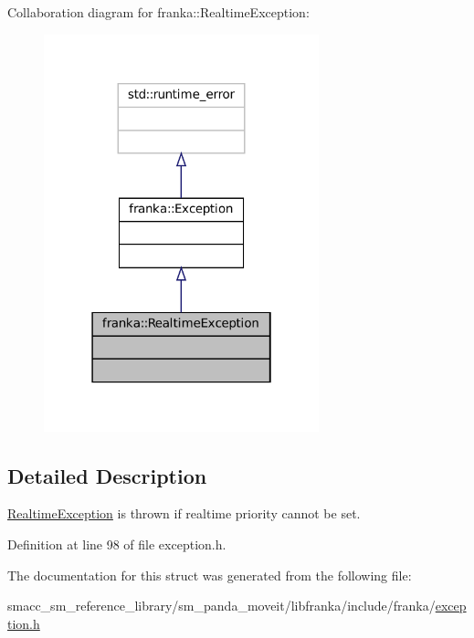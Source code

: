 Collaboration diagram for franka\+:\+:Realtime\+Exception\+:
\nopagebreak
\begin{figure}[H]
\begin{center}
\leavevmode
\includegraphics[width=226pt]{structfranka_1_1RealtimeException__coll__graph}
\end{center}
\end{figure}


\subsection{Detailed Description}
\hyperlink{structfranka_1_1RealtimeException}{Realtime\+Exception} is thrown if realtime priority cannot be set. 

Definition at line 98 of file exception.\+h.



The documentation for this struct was generated from the following file\+:\begin{DoxyCompactItemize}
\item 
smacc\+\_\+sm\+\_\+reference\+\_\+library/sm\+\_\+panda\+\_\+moveit/libfranka/include/franka/\hyperlink{exception_8h}{exception.\+h}\end{DoxyCompactItemize}
